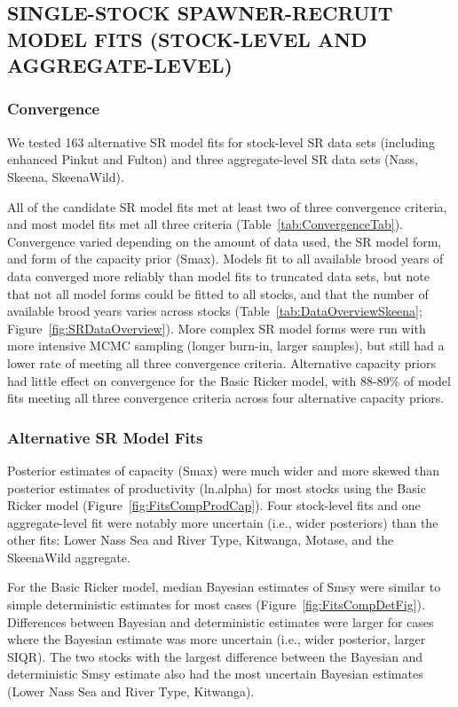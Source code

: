 \documentclass[french,11pt]{book}
\begin{document}
\subsection{SINGLE-STOCK SPAWNER-RECRUIT MODEL FITS (STOCK-LEVEL AND AGGREGATE-LEVEL)}\label{SingleStockSRResults}

\subsubsection{Convergence}\label{Convergence}

We tested 163 alternative SR model fits for  stock-level SR data sets (including enhanced Pinkut and Fulton) and three aggregate-level SR data sets (Nass, Skeena, SkeenaWild).

All of the candidate SR model fits met at least two of three convergence criteria, and most model fits met all three criteria (Table~\ref{tab:ConvergenceTab}). Convergence varied depending on the amount of data used, the SR model form, and form of the capacity prior (Smax). Models fit to all available brood years of data converged more reliably than model fits to truncated data sets, but note that not all model forms could be fitted to all stocks, and that the number of available brood years varies across stocks (Table~\ref{tab:DataOverviewSkeena}; Figure~\ref{fig:SRDataOverview}). More complex SR model forms were run with more intensive MCMC sampling (longer burn-in, larger samples), but still had a lower rate of meeting all three convergence criteria. Alternative capacity priors had little effect on convergence for the Basic Ricker model, with 88-89\% of model fits meeting all three convergence criteria across four alternative capacity priors.

\subsubsection{Alternative SR Model Fits}\label{alternative-sr-model-fits}

Posterior estimates of capacity (Smax) were much wider and more skewed than posterior estimates of productivity (ln.alpha) for most stocks using the Basic Ricker model (Figure~\ref{fig:FitsCompProdCap}). Four stock-level fits and one aggregate-level fit were notably more uncertain (i.e., wider posteriors) than the other fits: Lower Nass Sea and River Type, Kitwanga, Motase, and the SkeenaWild aggregate.

For the Basic Ricker model, median Bayesian estimates of Smsy were similar to simple deterministic estimates for most cases (Figure~\ref{fig:FitsCompDetFig}). Differences between Bayesian and deterministic estimates were larger for cases where the Bayesian estimate was more uncertain (i.e., wider posterior, larger SIQR). The two stocks with the largest difference between the Bayesian and deterministic Smsy estimate also had the most uncertain Bayesian estimates (Lower Nass Sea and River Type, Kitwanga).
\end{document}
